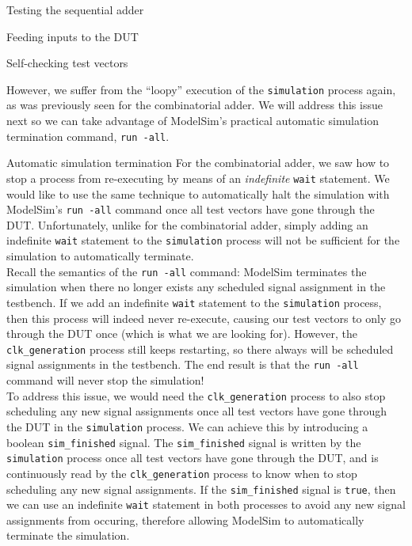 \documentclass[lab]{course}
\begin{document}
\begin{section}{Testing the sequential adder}
\begin{subsection}{Feeding inputs to the DUT}
\begin{subsubsection}{Self-checking test vectors}
\begin{enumerate}
                However, we suffer from the ``loopy'' execution of the \verb+simulation+ process again, as was previously seen for the combinatorial adder. We will address this issue next so we can take advantage of ModelSim's practical automatic simulation termination command, \verb+run -all+.
            \end{enumerate}
        \end{subsubsection}

        \begin{subsubsection}{Automatic simulation termination}
            For the combinatorial adder, we saw how to stop a process from re-executing by means of an \emph{indefinite} \verb+wait+ statement. We would like to use the same technique to automatically halt the simulation with ModelSim's \verb+run -all+ command once all test vectors have gone through the DUT. Unfortunately, unlike for the combinatorial adder, simply adding an indefinite \verb+wait+ statement to the \verb+simulation+ process will not be sufficient for the simulation to automatically terminate. \\

            Recall the semantics of the \verb+run -all+ command: ModelSim terminates the simulation when there no longer exists any scheduled signal assignment in the testbench. If we add an indefinite \verb+wait+ statement to the \verb+simulation+ process, then this process will indeed never re-execute, causing our test vectors to only go through the DUT once (which is what we are looking for). However, the \verb+clk_generation+ process still keeps restarting, so there always will be scheduled signal assignments in the testbench. The end result is that the \verb+run -all+ command will never stop the simulation! \\

            To address this issue, we would need the \verb+clk_generation+ process to also stop scheduling any new signal assignments once all test vectors have gone through the DUT in the \verb+simulation+ process. We can achieve this by introducing a boolean \verb+sim_finished+ signal. The \verb+sim_finished+ signal is written by the \verb+simulation+ process once all test vectors have gone through the DUT, and is continuously read by the \verb+clk_generation+ process to know when to stop scheduling any new signal assignments. If the \verb+sim_finished+ signal is \verb+true+, then we can use an indefinite \verb+wait+ statement in both processes to avoid any new signal assignments from occuring, therefore allowing ModelSim to automatically terminate the simulation. \\


\end{subsubsection}
\end{subsection}
\end{section}
\end{document}
